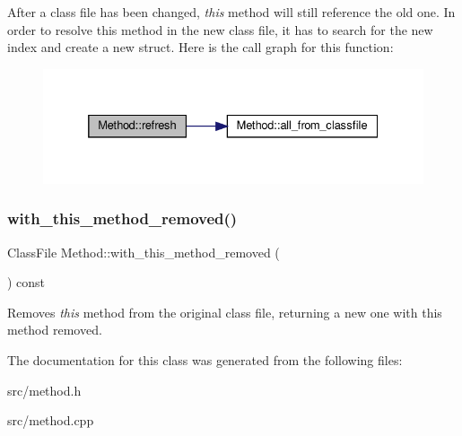 After a class file has been changed, {\itshape this} method will still reference the old one. In order to resolve this method in the new class file, it has to search for the new index and create a new struct. Here is the call graph for this function\+:\nopagebreak
\begin{figure}[H]
\begin{center}
\leavevmode
\includegraphics[width=332pt]{classMethod_ac6a47d5797a62c5ffbb39df54ff7171d_cgraph}
\end{center}
\end{figure}
\mbox{\label{classMethod_a52e769352ce657232db3a1b936e930b1}} 
\subsubsection{\texorpdfstring{with\+\_\+this\+\_\+method\+\_\+removed()}{with\_this\_method\_removed()}}
{\footnotesize\ttfamily Class\+File Method\+::with\+\_\+this\+\_\+method\+\_\+removed (\begin{DoxyParamCaption}{ }\end{DoxyParamCaption}) const}

Removes {\itshape this} method from the original class file, returning a new one with this method removed. 

The documentation for this class was generated from the following files\+:\begin{DoxyCompactItemize}
\item 
src/method.\+h\item 
src/method.\+cpp\end{DoxyCompactItemize}

